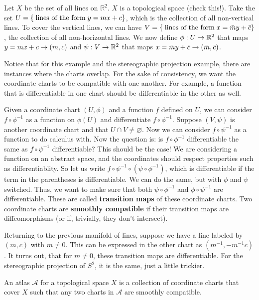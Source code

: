 \documentclass{mathnotes}
\begin{document}
\begin{exmp}
    Let $X$ be the set of all lines on $\mathbb{R}^2$. $X$ is a topological space (check this!). Take the set $U=\left\{ \;\textnormal{lines of the form}\; y=mx+c \right\}$,
    which is the collection of all non-vertical lines. To cover the vertical lines, we can have $V=\left\{ \;\textnormal{lines of the form}\;x=\bar{m}y+\bar{c} \right\}$,
    the collection of all non-horizontal lines. We now define $\phi:U\rightarrow\mathbb{R}^2$ that maps $y=mx+c\rightarrow(m,c)$ and $\psi:V\rightarrow\mathbb{R}^2$ that maps
    $x=\bar{m}y+\bar{c}\rightarrow(\bar{m},\bar{c})$.
\end{exmp}

Notice that for this example and the stereographic projection example, there are instances where the charts overlap. For the sake of consistency, we want
the coordinate charts to be compatible with one another. For example, a function that is differentiable in one chart should be differentiable in the other
as well.

\begin{defn}
    Given a coordinate chart $(U,\phi)$ and a function $f$ defined on $U$, we can consider $f\circ \phi^{-1}$ as a function on $\phi(U)$ and differentiate
    $f\circ \phi^{-1}$. Suppose $(V,\psi)$ is another coordinate chart and that $U\cap V\neq \varnothing$. Now we can consider $f\circ\psi^{-1}$ as a function
    to do calculus with. Now the question is: is $f\circ \phi^{-1}$ differentiable the same as $f\circ\psi^{-1}$ differentiable? This should be the case!
    We are considering a function on an abstract space, and the coordinates should respect properties such as differentiablity. So let us write
    $f\circ\psi^{-1}\circ(\psi\circ\phi^{-1})$, which is differentiable if the term in the parentheses is differentiable. We can do the same, but with
    $\phi$ and $\psi$ switched. Thus, we want to make sure that both $\psi\circ\phi^{-1}$ and $\phi\circ\psi^{-1}$ are differentiable. These are called
    \textbf{transition maps} of these coordinate charts. Two coordinate charts are \textbf{smoothly compatible} if their transition maps are diffeomorphisms
    (or if, trivially, they don't intersect).
\end{defn}

Returning to the previous manifold of lines, suppose we have a line labeled by $(m,c)$ with $m\neq 0$. This can be expressed in the other chart as
$(m^{-1},-m^{-1}c)$. It turns out, that for $m\neq 0$, these transition maps are differentiable. For the stereographic projection of $S^2$, it is the same,
just a little trickier.

\begin{defn}
    An atlas $\mathcal{A}$ for a topological space $X$ is a collection of coordinate charts that cover $X$ such that any two charts in $\mathcal{A}$
    are smoothly compatible.
\end{defn}
\end{document}
